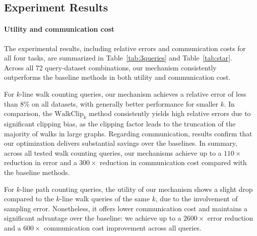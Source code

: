 
\subsection{Experiment Results}
\label{subsec:exp_results}


\paragraph{Utility and communication cost}


The experimental results, including relative errors and communication costs for all four tasks, are summarized in Table~\ref{tab:3queries} and Table~\ref{tab:star}. 
Across all {72} query-dataset combinations, our mechanism consistently outperforms the baseline methods in both utility and communication cost.



For $k$-line walk counting queries, our mechanism achieves a relative error of less than {$8\%$} on all datasets, 
with generally better performance for {smaller $k$.}
{In comparison, the $\mathrm{WalkClip}_k$ method consistently yields high relative errors due to significant clipping bias, as the clipping factor leads to the truncation of the majority of walks in large graphs.}
{Regarding communication, results confirm that our optimization delivers substantial savings over the baselines.}
{In summary, across all tested walk counting queries, our mechanisms achieve up to a $110\times$ reduction in error and a $300\times$ reduction in communication cost compared with the baseline methods.
}




For $k$-line path counting queries, the utility of our mechanism shows a slight drop compared to the $k$-line walk queries of the same $k$, due to the involvement of sampling error. 
Nonetheless, it offers lower communication cost and maintains a significant advantage over the baseline: 
{we achieve up to a $2600\times$ error reduction and a $600\times$ communication cost improvement across all queries.}




